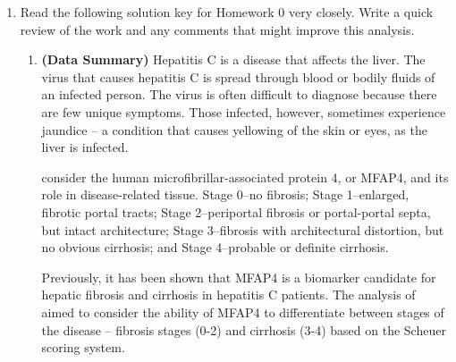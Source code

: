 \documentclass{article}
\begin{document}
\begin{enumerate}
\item Read the following solution key for Homework 0 very closely. Write a quick
review of the work and any comments that might improve this analysis.\\
\begin{enumerate}
    \item \textbf{(Data Summary)} Hepatitis C is a disease 
    that affects the liver. The virus that causes hepatitis C 
    is spread through blood or bodily fluids of an infected person. 
    The virus is often difficult to diagnose because there are few unique 
    symptoms. Those infected, however, sometimes experience jaundice -- a 
    condition that causes yellowing of the skin or eyes, as the liver 
    is infected.

    \cite{Bracht16} consider the human microfibrillar-associated protein 4,
    or MFAP4, and its role in disease-related tissue. Stage 0--no fibrosis; 
    Stage 1--enlarged, fibrotic portal tracts; Stage 2--periportal fibrosis 
    or portal-portal septa, but intact architecture; Stage 3--fibrosis with
    architectural distortion, but no obvious cirrhosis; and Stage 4--probable
    or definite cirrhosis.

    Previously, it has been shown that MFAP4 is a biomarker candidate for hepatic
    fibrosis and cirrhosis in hepatitis C patients. The analysis of \cite{Bracht16}
    aimed to consider the ability of MFAP4 to differentiate between stages of the 
    disease -- fibrosis stages (0-2) and cirrhosis (3-4) based on the Scheuer 
    scoring system.
    

\end{enumerate}
\end{enumerate}
\end{document}
